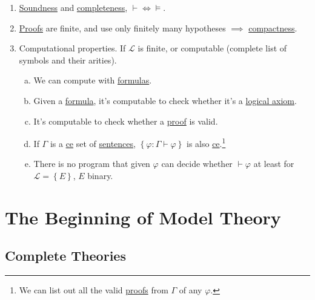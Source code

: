 \begin{enumerate}[(1)]
	\item \hyperref[thm:soundness]{Soundness} and \hyperref[thm:completeness]{completeness}, \(\vdash \iff \models \).
	\item \hyperref[def:proof]{Proofs} are finite, and use only finitely many hypotheses \(\implies \) \hyperref[thm:compactness]{compactness}.
	\item Computational properties. If \(\mathcal{L} \) is finite, or computable (complete list of symbols and their arities).
	      \begin{enumerate}[(a)]
		      \item We can compute with \hyperref[def:formula]{formulas}.
		      \item Given a \hyperref[def:formula]{formula}, it's computable to check whether it's a \hyperref[def:logical-axioms]{logical axiom}.
		      \item It's computable to check whether a \hyperref[def:proof]{proof} is valid.
		      \item If \(\Gamma \) is a \hyperref[def:computably-enumerable]{ce} set of \hyperref[def:sentence]{sentences}, \(\left\{ \varphi \colon \Gamma \vdash \varphi \right\} \) is also \hyperref[def:computably-enumerable]{ce}.\footnote{We can list out all the valid \hyperref[def:proof]{proofs} from \(\Gamma \) of any \(\varphi \).}
		      \item There is no program that given \(\varphi \) can decide whether \(\vdash \varphi \) at least for \(\mathcal{L} =\left\{ E \right\} \), \(E\) binary.
	      \end{enumerate}
\end{enumerate}

\chapter{The Beginning of Model Theory}
\section{Complete Theories}

